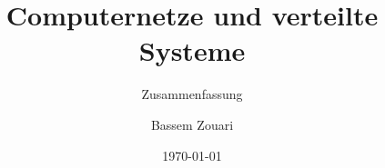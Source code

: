 \documentclass[
    ngerman,
    color=2b,
    loadcommon, %
    summary,
    boxarc,
    main,
]{rubos-tuda-template}
\title[CNuvS]{Computernetze und verteilte Systeme}
\subtitle{Zusammenfassung}
\author{Bassem Zouari}
\date{\today}
\begin{document}
\maketitle{}
\tableofcontents %
\clearpage

%    
%
%

\clearpage

\clearpage

\clearpage

\end{document}
